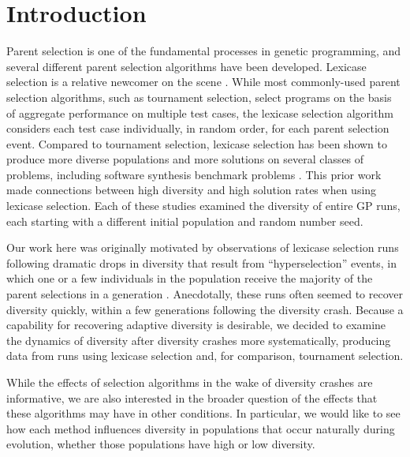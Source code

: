 \documentclass{sig-alternate-05-2015}
\begin{document}
%
%
\printccsdesc



\section{Introduction}
\label{sec:introduction}

Parent selection is one of the fundamental processes in genetic programming, and several different parent selection algorithms have been developed. Lexicase selection is a relative newcomer on the scene \cite{Spector:2012:GECCOcompANEW, Helmuth:2015:ieeeTEC}. While most commonly-used parent selection algorithms, such as tournament selection, select programs on the basis of aggregate performance on multiple test cases, the lexicase selection algorithm considers each test case individually, in random order, for each parent selection event. 
Compared to tournament selection, lexicase selection has been shown to produce more diverse populations and more solutions on several classes of problems, including software synthesis benchmark problems \cite{Helmuth:2015:ieeeTEC, Helmuth:2015:dissertation, Helmuth:2015:GECCO, Helmuth:2015:GPTP}. This prior work made connections between high diversity and high solution rates when using lexicase selection. Each of these studies examined the diversity of entire GP runs, each starting with a different initial population and random number seed.

Our work here was originally motivated by observations of lexicase selection runs following dramatic drops in diversity that result from ``hyperselection'' events, in which one or a few individuals in the population receive the majority of the parent selections in a generation \cite{Helmuth:2016:GECCO}. Anecdotally, these runs often seemed to recover diversity quickly, within a few generations following the diversity crash. Because a capability for recovering adaptive diversity is desirable, we decided to examine the dynamics of diversity  after diversity crashes more systematically, producing data from runs using lexicase selection and, for comparison, tournament selection. 

While the effects of selection algorithms in the wake of diversity crashes are informative, we are also interested in the broader question of the effects that these algorithms may have in other conditions. In particular, we would like to see how each method influences diversity in populations that occur naturally during evolution, whether those populations have high or low diversity.
\end{document}

